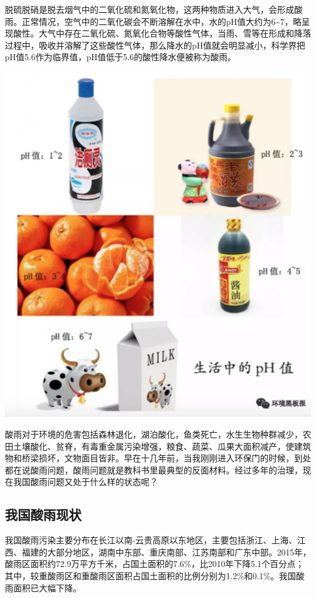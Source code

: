 \documentclass[
]{book}
\begin{document}
脱硫脱硝是脱去烟气中的二氧化硫和氮氧化物，这两种物质进入大气，会形成酸雨。正常情况，空气中的二氧化碳会不断溶解在水中，水的pH值大约为6\textasciitilde7，略呈现酸性。大气中存在二氧化硫、氮氧化合物等酸性气体，当雨、雪等在形成和降落过程中，吸收并溶解了这些酸性气体，那么降水的pH值就会明显减小，科学界把pH值5.6作为临界值，pH值低于5.6的酸性降水便被称为酸雨。

\includegraphics[width=7.39in]{images/acidrain1}

酸雨对于环境的危害包括森林退化，湖泊酸化，鱼类死亡，水生生物种群减少，农田土壤酸化、贫脊，有毒重金属污染增强，粮食、蔬菜、瓜果大面积减产，使建筑物和桥梁损坏，文物面目皆非。早在十几年前，当我刚刚进入环保门的时候，到处都在说酸雨问题，酸雨问题就是教科书里最典型的反面材料。经过多年的治理，现在我国酸雨问题又处于什么样的状态呢？

\hypertarget{ux6211ux56fdux9178ux96e8ux73b0ux72b6}{%
\subsection{我国酸雨现状}\label{ux6211ux56fdux9178ux96e8ux73b0ux72b6}}

我国酸雨污染主要分布在长江以南-云贵高原以东地区，主要包括浙江、上海、江西、福建的大部分地区，湖南中东部、重庆南部、江苏南部和广东中部。2015年，酸雨区面积约72.9万平方千米，占国土面积的7.6\%，比2010年下降5.1个百分点；其中，较重酸雨区和重酸雨区面积占国土面积的比例分别为1.2\%和0.1\%。我国酸雨面积已大幅下降。
\end{document}
